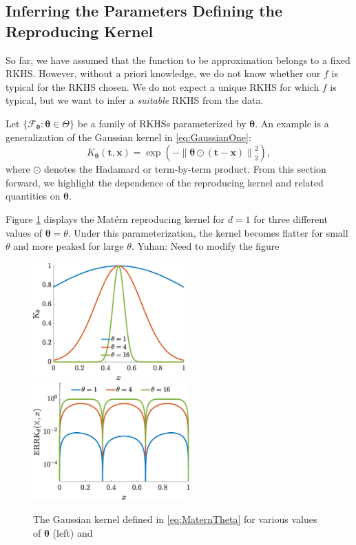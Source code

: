 \documentclass[]{mcom-l}
\theoremstyle{theorem}
\theoremstyle{remark}
\newcommand{\bx}{{\boldsymbol{x}}}
\newcommand{\bt}{{\boldsymbol{t}}}
\newcommand{\btheta}{{\boldsymbol{\theta}}}
\newcommand{\calf}{{\mathcal{F}}}
\newcommand{\norm}[2][{}]{\ensuremath{\left \lVert #2 \right \rVert}_{#1}}
\newcommand{\YuhanNote}[1]{{\color{magenta}Yuhan: #1}}
\begin{document}
\subsection{Inferring the Parameters Defining the Reproducing Kernel} \label{sec:adaptTheta}

So far, we have assumed that the function to be approximation belongs to a fixed RKHS.  However, without  a priori knowledge, we do not know whether our $f$ is typical for  the RKHS chosen.  We do not expect a unique RKHS for which $f$ is typical, but we want to infer a \emph{suitable} RKHS from the data.  

Let $\{\calf_{\btheta} : \btheta \in \Theta\}$ be a family of RKHSs parameterized by $\btheta$.  An example is a generalization of the Gaussian kernel  in \eqref{eq:GaussianOne}:
\begin{equation} \label{eq:MaternTheta}
K_\btheta(\bt,\bx) =  \exp(-\norm[2]{\btheta \odot (\bt-\bx)}^2),
\end{equation}
where $\odot$ denotes the Hadamard or term-by-term product.  From this section forward, we highlight the dependence of the reproducing kernel and related quantities on $\btheta$.

Figure \ref{fig:MaternThPlot} displays the Mat\'ern reproducing kernel for $d=1$ for three different values of $\btheta = \theta$.  Under this parameterization, the kernel becomes flatter for small $\theta$ and more peaked for large $\theta$.  \YuhanNote{Need to modify the figure}

\begin{figure}[H]
	\centering
	\includegraphics[height = 4.5cm]{ProgramsImages/KthetaPlot.eps} \quad
	\includegraphics[height = 4.5cm]{ProgramsImages/errKplotth.eps}
	\caption{The Gaussian kernel defined in \eqref{eq:MaternTheta} for various values of $\btheta$ (left) and \label{fig:MaternThPlot}}
\end{figure}
\end{document}
